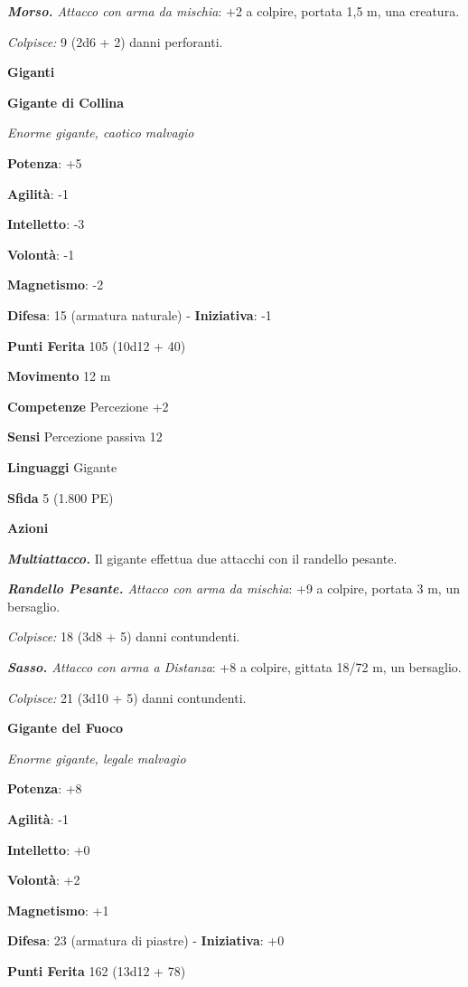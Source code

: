 \begin{multicols}{2}
\emph{\textbf{Morso.} Attacco con arma da mischia}: +2 a colpire,
portata 1,5 m, una creatura.

\emph{Colpisce:} 9 (2d6 + 2) danni perforanti.



\textbf{Giganti}

\textbf{Gigante di Collina}

\emph{Enorme gigante, caotico malvagio}

\textbf{Potenza}: +5

\textbf{Agilità}: -1

\textbf{Intelletto}: -3

\textbf{Volontà}: -1

\textbf{Magnetismo}: -2

\textbf{Difesa}: 15 (armatura naturale) - \textbf{Iniziativa}: -1

\textbf{Punti Ferita} 105 (10d12 + 40)

\textbf{Movimento} 12 m

\textbf{Competenze} Percezione +2

\textbf{Sensi} Percezione passiva 12

\textbf{Linguaggi} Gigante

\textbf{Sfida} 5 (1.800 PE)

\textbf{Azioni}

\emph{\textbf{Multiattacco.}} Il gigante effettua due attacchi con il
randello pesante.

\emph{\textbf{Randello Pesante.} Attacco con arma da mischia}: +9 a
colpire, portata 3 m, un bersaglio.

\emph{Colpisce:} 18 (3d8 + 5) danni contundenti.

\emph{\textbf{Sasso.} Attacco con arma a Distanza}: +8 a colpire,
gittata 18/72 m, un bersaglio.

\emph{Colpisce:} 21 (3d10 + 5) danni contundenti.

\textbf{Gigante del Fuoco}

\emph{Enorme gigante, legale malvagio}

\textbf{Potenza}: +8

\textbf{Agilità}: -1

\textbf{Intelletto}: +0

\textbf{Volontà}: +2

\textbf{Magnetismo}: +1

\textbf{Difesa}: 23 (armatura di piastre) - \textbf{Iniziativa}: +0

\textbf{Punti Ferita} 162 (13d12 + 78)


\end{multicols}
